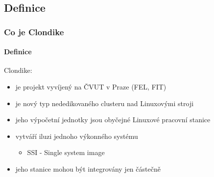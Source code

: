 \documentclass{beamer}
\begin{document}
\subsection {Definice}
\begin{frame}
\frametitle{Co je Clondike}
\framesubtitle{Definice}
	Clondike:
	\begin {itemize}
		\item je projekt vyvíjený na ČVUT v Praze (FEL, FIT)
		\pause
		\item je nový typ nededikovaného clusteru nad Linuxovými stroji
		\item jeho výpočetní jednotky jsou obyčejné Linuxové pracovní stanice
		\pause
		\item vytváří iluzi jednoho výkonného systému
		\begin {itemize}
			\item SSI - Single system image
		\end{itemize}
		\pause
		\item jeho stanice mohou být integrovány jen částečně
	\end{itemize}
\end{frame}
\end{document}
